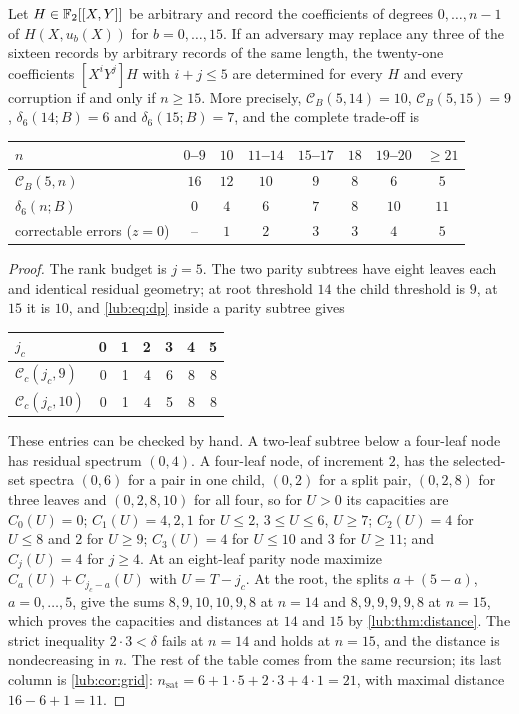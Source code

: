 \begin{theorem}\label{lub:thm:binary}
Let $H\in\mathbb{F}_2[[X,Y]]$ be arbitrary and record the coefficients of degrees $0,\dots,n-1$ of
$H(X,u_b(X))$ for $b=0,\dots,15$. If an adversary may replace any three of the sixteen
records by arbitrary records of the same length, the twenty-one coefficients $[X^iY^j]H$
with $i+j\le5$ are determined for every $H$ and every corruption if and only if $n\ge15$.
More precisely, $\mathcal C_B(5,14)=10$, $\mathcal C_B(5,15)=9$, $\delta_6(14;B)=6$ and
$\delta_6(15;B)=7$, and the complete trade-off is
\begin{center}\small
\begin{tabular}{lccccccc}
\toprule
$n$ & $0$--$9$ & $10$ & $11$--$14$ & $15$--$17$ & $18$ & $19$--$20$ & $\ge21$\\
\midrule
$\mathcal C_B(5,n)$ & $16$ & $12$ & $10$ & $9$ & $8$ & $6$ & $5$\\
$\delta_6(n;B)$ & $0$ & $4$ & $6$ & $7$ & $8$ & $10$ & $11$\\
correctable errors ($z=0$) & -- & $1$ & $2$ & $3$ & $3$ & $4$ & $5$\\
\bottomrule
\end{tabular}
\end{center}
\end{theorem}

\begin{proof}
The rank budget is $j=5$. The two parity subtrees have eight leaves each and identical
residual geometry; at root threshold $14$ the child threshold is $9$, at $15$ it is $10$,
and \eqref{lub:eq:dp} inside a parity subtree gives
\begin{center}\small
\begin{tabular}{lrrrrrr}
\toprule
$j_c$ & 0&1&2&3&4&5\\
\midrule
$\mathcal C_c(j_c,9)$ &0&1&4&6&8&8\\
$\mathcal C_c(j_c,10)$&0&1&4&5&8&8\\
\bottomrule
\end{tabular}
\end{center}
These entries can be checked by hand. A two-leaf subtree below a four-leaf node has residual
spectrum $(0,4)$. A four-leaf node, of increment $2$, has the selected-set spectra $(0,6)$
for a pair in one child, $(0,2)$ for a split pair, $(0,2,8)$ for three leaves and
$(0,2,8,10)$ for all four, so for $U>0$ its capacities are $C_0(U)=0$;
$C_1(U)=4,2,1$ for $U\le2$, $3\le U\le6$, $U\ge7$; $C_2(U)=4$ for $U\le8$ and $2$ for
$U\ge9$; $C_3(U)=4$ for $U\le10$ and $3$ for $U\ge11$; and $C_j(U)=4$ for $j\ge4$. At an
eight-leaf parity node maximize $C_a(U)+C_{j_c-a}(U)$ with $U=T-j_c$. At the root, the
splits $a+(5-a)$, $a=0,\dots,5$, give the sums $8,9,10,10,9,8$ at $n=14$ and
$8,9,9,9,9,8$ at $n=15$, which proves the capacities and distances at $14$ and $15$ by
\cref{lub:thm:distance}. The strict inequality $2\cdot3<\delta$ fails at $n=14$ and holds
at $n=15$, and the distance is nondecreasing in $n$. The rest of the table comes from the
same recursion; its last column is \cref{lub:cor:grid}:
$n_{\mathrm{sat}}=6+1\cdot5+2\cdot3+4\cdot1=21$, with maximal distance $16-6+1=11$.
\end{proof}

